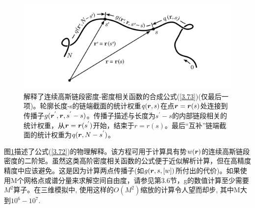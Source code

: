 \begin{figure}[h]
\centering
\includegraphics[width=15cm]{Contents/chapter3/figures/33.png}
\caption{解释了连续高斯链段密度-密度相关函数的合成公式(\ref{3.73})(仅最后一项)。轮廓长度-s的链端截面的统计权重$q(\bm{r},s)$在点$\bm{r}=\bm{r}(s)$处连接到传播子$g(\bm{r}^{'},\bm{r},s^{'}-s)$。传播子描述与长度为$s^{'}-s$的内部链段相关的统计权重，从$\bm{r}=\bm{r}(s^{'})$开始，结束于$r=r(s)$。最后“互补”链端截面的统计权重为$q(\bm{r},N-s^{'})$。}
\label{figure2}
\end{figure}

图\ref{figure2}描述了公式(\ref{3.72})的物理解释。该方程可用于计算具有势$w(\bm{r})$的连续高斯链段密度的二阶矩。虽然这类高阶密度相关函数的公式便于近似解析计算，但在高精度精度中应该避免。这是因为计算两点传播子(如$g(\bm{r},s,[w])$所付出的代价)。如果使用M个网格点或谱分量来求解空间自由度，请参见第3.6节，g的数值计算至少需要$M^2$算子。在三维模拟中, 使用这样的$O(M^2)$缩放的计算令人望而却步, 其中M大到$10^6-10^7$.
